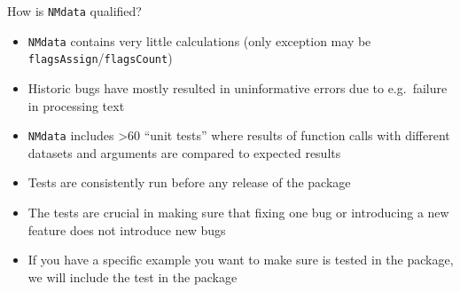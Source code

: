 \documentclass[
  8pt,
  ignorenonframetext,
  aspectratio=169]{beamer}
\begin{document}
\begin{frame}[fragile]{How is \texttt{NMdata} qualified?}
\protect\hypertarget{how-is-nmdata-qualified}{}
\begin{itemize}
\item
  \texttt{NMdata} contains very little calculations (only exception may
  be \texttt{flagsAssign}/\texttt{flagsCount})
\item
  Historic bugs have mostly resulted in uninformative errors due to
  e.g.~failure in processing text
\item
  \texttt{NMdata} includes \textgreater60 ``unit tests'' where results
  of function calls with different datasets and arguments are compared
  to expected results
\item
  Tests are consistently run before any release of the package
\item
  The tests are crucial in making sure that fixing one bug or
  introducing a new feature does not introduce new bugs
\item
  If you have a specific example you want to make sure is tested in the
  package, we will include the test in the package
\end{itemize}
\end{frame}
\end{document}
